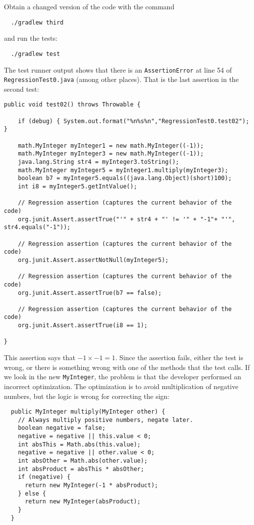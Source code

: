 \documentclass[11pt, oneside]{article} %
\newcommand{\code}[1]{{\texttt{#1}}}
\begin{document}
Obtain a changed version of the code with the command
\begin{verbatim}
  ./gradlew third 
\end{verbatim}
and run the tests:
\begin{verbatim}
  ./gradlew test 
\end{verbatim}
The test runner output shows that there is an \code{AssertionError} at line
54 of \code{RegressionTest0.java} (among other places).
That is the last assertion in the second test:
\begin{verbatim}
public void test02() throws Throwable {

    if (debug) { System.out.format("%n%s%n","RegressionTest0.test02"); }

    math.MyInteger myInteger1 = new math.MyInteger((-1));
    math.MyInteger myInteger3 = new math.MyInteger((-1));
    java.lang.String str4 = myInteger3.toString();
    math.MyInteger myInteger5 = myInteger1.multiply(myInteger3);
    boolean b7 = myInteger5.equals((java.lang.Object)(short)100);
    int i8 = myInteger5.getIntValue();
    
    // Regression assertion (captures the current behavior of the code)
    org.junit.Assert.assertTrue("'" + str4 + "' != '" + "-1"+ "'", str4.equals("-1"));
    
    // Regression assertion (captures the current behavior of the code)
    org.junit.Assert.assertNotNull(myInteger5);
    
    // Regression assertion (captures the current behavior of the code)
    org.junit.Assert.assertTrue(b7 == false);
    
    // Regression assertion (captures the current behavior of the code)
    org.junit.Assert.assertTrue(i8 == 1);

}
\end{verbatim}
This assertion says that $-1 \times -1 = 1$.
Since the assertion fails, either the test is wrong, or there is something
wrong with one of the methods that the test calls.
If we look in the new \code{MyInteger}, the problem is that the developer
performed an incorrect optimization.  The optimization is to avoid
multiplication of negative numbers, but the logic is wrong for correcting
the sign:
\begin{verbatim}
  public MyInteger multiply(MyInteger other) {
    // Always multiply positive numbers, negate later.
    boolean negative = false;
    negative = negative || this.value < 0;
    int absThis = Math.abs(this.value);
    negative = negative || other.value < 0;
    int absOther = Math.abs(other.value);
    int absProduct = absThis * absOther;
    if (negative) {
      return new MyInteger(-1 * absProduct);
    } else {
      return new MyInteger(absProduct);
    }
  }
\end{verbatim}
\end{document}
